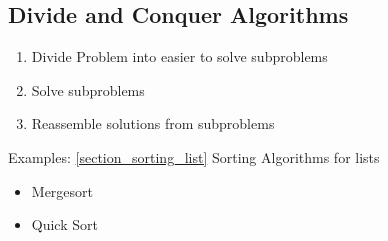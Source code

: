 \subsection{Divide and Conquer Algorithms}
    \begin{enumerate}
        \item Divide Problem into easier to solve subproblems
        \item Solve subproblems
        \item Reassemble solutions from subproblems
    \end{enumerate}
    Examples: \ref*{section_sorting_list} Sorting Algorithms for lists
    \begin{itemize}
        \item Mergesort
        \item Quick Sort
    \end{itemize}
    